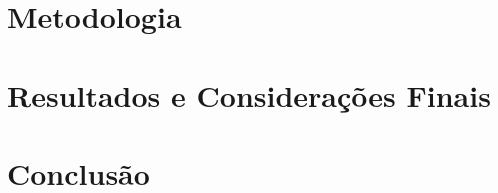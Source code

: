 \documentclass[
	12pt,	
    oneside,
    a4paper,
    brazil  
]{abntex2}
\begin{document}
\chapter{Metodologia}
\label{cap:metodologia}


\chapter{Resultados e Considerações Finais}
\label{cap:resultados}


\chapter{Conclusão}
\label{cap:conclusao}

    



\begin{apendicesenv}

\end{apendicesenv}
\end{document}
